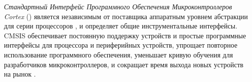 \secdown

\emph{Стандартный Интерфейс Программного Обеспечения Микроконтроллеров Cortex}
() является независимым от поставщика аппаратным уровнем абстракции
для серии процессоров \cm, и определяет общие инструментальные интерфейсы. CMSIS
обеспечивает постоянную поддержку устройств и простые программные интерфейсы для
процессора и периферийных устройств, упрощает повторное использование
программного обеспечения, уменьшает кривую обучения для разработчиков
микроконтроллеров, и сокращает время выхода новых устройств на рынок .

\secup